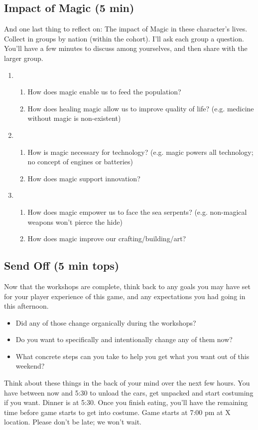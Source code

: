 \documentclass[green]{GL2020}
\begin{document}
\subsection*{Impact of Magic (5 min)}
And one last thing to reflect on: The impact of Magic in these character’s lives. Collect in groups by nation (within the cohort). I’ll ask each group a question. You’ll have a few minutes to discuss among yourselves, and then share with the larger group.
\begin{enumerate}
	\item \pFarm{}
	\begin{enumerate}
		\item How does magic enable us to feed the population?
		\item How does healing magic allow us to improve quality of life? (e.g. medicine without magic is non-existent)
	\end{enumerate}
	\item \pTech{}
	\begin{enumerate}
		\item How is magic necessary for technology? (e.g. magic powers all technology; no concept of engines or batteries)
		\item How does magic support innovation?
	\end{enumerate}
	\item \pShip{}
	\begin{enumerate}
		\item How does magic empower us to face the sea serpents? (e.g. non-magical weapons won’t pierce the hide)
		\item How does magic improve our crafting/building/art?
	\end{enumerate}
\end{enumerate}

\subsection*{Send Off (5 min tops)}
Now that the workshops are complete, think back to any goals you may have set for your player experience of this game, and any expectations you had going in this afternoon. 
\begin{itemize}
	\item Did any of those change organically during the workshops? 
	\item Do you want to specifically and intentionally change any of them now? 
	\item What concrete steps can you take to help you get what you want out of this weekend?
\end{itemize}

Think about these things in the back of your mind over the next few hours. You have between now and 5:30 to unload the cars, get unpacked and start costuming if you want. Dinner is at 5:30. Once you finish eating, you’ll have the remaining time before game starts to get into costume. Game starts at 7:00 pm at X location. Please don’t be late; we won’t wait.
\end{document}
